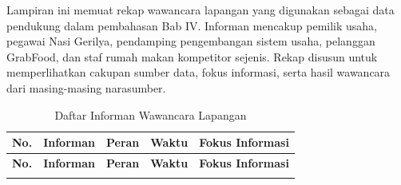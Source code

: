 \label{app:dokumentasi-wawancara-lapangan}

Lampiran ini memuat rekap wawancara lapangan yang digunakan sebagai data pendukung dalam pembahasan Bab IV. Informan mencakup pemilik usaha, pegawai Nasi Gerilya, pendamping pengembangan sistem usaha, pelanggan GrabFood, dan staf rumah makan kompetitor sejenis. Rekap disusun untuk memperlihatkan cakupan sumber data, fokus informasi, serta hasil wawancara dari masing-masing narasumber.

\begingroup
\scriptsize
\begin{xltabular}{\textwidth}{|C{0.7cm}|L{2.2cm}|L{2.8cm}|C{2.0cm}|Y|}
\caption{Daftar Informan Wawancara Lapangan}
\label{tab:daftar-informan-wawancara-lapangan} \\
\toprule
\textbf{No.} & \textbf{Informan} & \textbf{Peran} & \textbf{Waktu} & \textbf{Fokus Informasi} \\ \hline
\midrule
\endfirsthead

\toprule
\textbf{No.} & \textbf{Informan} & \textbf{Peran} & \textbf{Waktu} & \textbf{Fokus Informasi} \\ \hline
\midrule
\endhead

\endfoot

\bottomrule
\endlastfoot


\end{xltabular}
